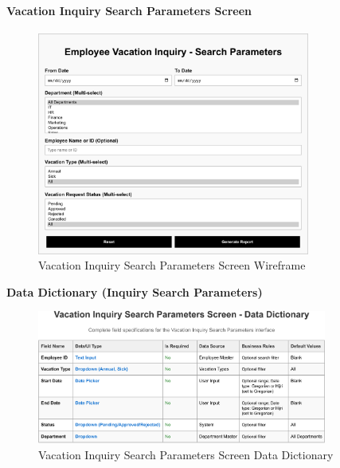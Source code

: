 \documentclass[12pt,a4paper]{article}
\begin{document}
\paragraph{Vacation Inquiry Search Parameters Screen}
\begin{figure}[H]
\centering
\includegraphics[width=0.8\textwidth]{Wireframes/Employee-Vacation-Inquiry-Search-Parameters/Employee-Vacation-Inquiry-Search-Parameters-1.png}
\caption{Vacation Inquiry Search Parameters Screen Wireframe}
\label{fig:wireframe-inquiry-search-params}
\end{figure}

\noindent\textbf{Data Dictionary (Inquiry Search Parameters)}
\begin{figure}[H]
\centering
\includegraphics[width=0.85\textwidth]{Data-Dictionary/Screen-Data-Dictionaries/Vacation-Inquiry-Search-Parameters-Screen-Data-Dictionary/Vacation-Inquiry-Search-Parameters-Screen-Data-Dictionary-1.png}
\caption{Vacation Inquiry Search Parameters Screen Data Dictionary}
\label{fig:inquiry-search-params-data-dict-inline}
\end{figure}
\end{document}
